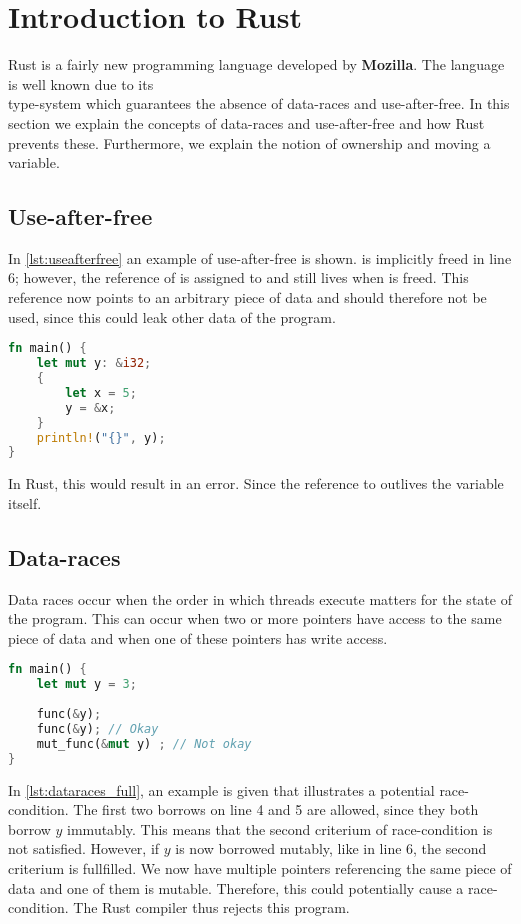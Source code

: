 \section{Introduction to Rust}\label{s:rust}
Rust is a fairly new programming language developed by \textbf{Mozilla}. The language is well known due to its\\ type-system which guarantees the absence of data-races and use-after-free. In this section we explain the concepts of data-races and use-after-free and how Rust prevents these. Furthermore, we explain the notion of ownership and moving a variable. 

\subsection{Use-after-free} 
In \autoref{lst:useafterfree} an example of use-after-free is shown.  is implicitly freed in line 6; however, the reference of  is assigned to  and still lives when  is freed. This reference now points to an arbitrary piece of data and should therefore not be used, since this could leak other data of the program. 

 \begin{lstlisting}[language=rust, showstringspaces=false, escapechar=~, label={lst:useafterfree}, caption={Example of use-after-free}]
fn main() { 
    let mut y: &i32;
    {
        let x = 5;
        y = &x;
    }
    println!("{}", y); 
}

\end{lstlisting}
In Rust, this would result in an error. Since the reference to  outlives the variable itself. 

\subsection{Data-races}
Data races occur when the order in which threads execute matters for the state of the program. This can occur when two or more pointers have access to the same piece of data and when one of these pointers has write access. 

 \begin{lstlisting}[language=rust, showstringspaces=false, escapechar=~, label={lst:dataraces_full}, caption={Example of potential data-race}]
fn main() { 
    let mut y = 3;
    
    func(&y);
    func(&y); // Okay
    mut_func(&mut y) ; // Not okay 
}
\end{lstlisting}
In \autoref{lst:dataraces_full}, an example is given that illustrates a potential race-condition. The first two borrows on line 4 and 5 are allowed, since they both borrow $y$ immutably. This means that the second criterium of race-condition is not satisfied. However, if $y$ is now borrowed mutably, like in line 6, the second criterium is fullfilled. We now have multiple pointers referencing the same piece of data and one of them is mutable. Therefore, this could potentially cause a race-condition. The Rust compiler thus rejects this program.\\


